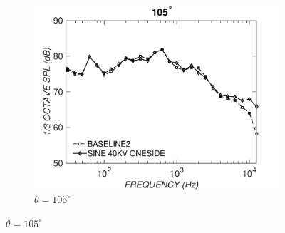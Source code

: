 \begin{figure}
\begin{subfigure}{0.32\textwidth}
\includegraphics[width=\linewidth]{figures/octave1052}
\caption{$\theta=105^\circ$}
\label{fig:octave1052}
\end{subfigure}


\end{figure}
